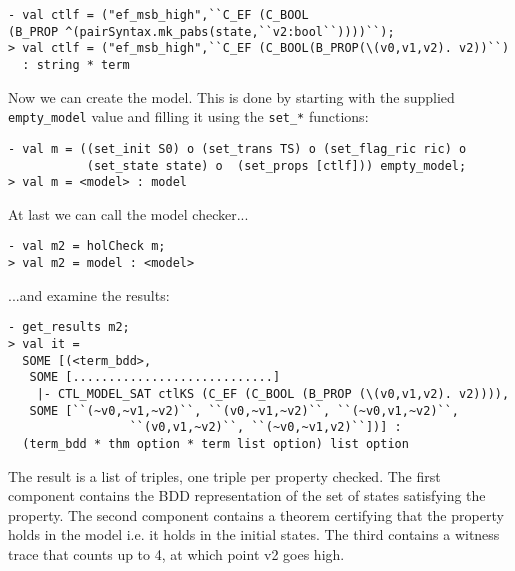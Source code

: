 \documentclass[12pt,fleqn]{article}
\begin{document}
\begin{session}\begin{verbatim}
- val ctlf = ("ef_msb_high",``C_EF (C_BOOL
(B_PROP ^(pairSyntax.mk_pabs(state,``v2:bool``))))``);
> val ctlf = ("ef_msb_high",``C_EF (C_BOOL(B_PROP(\(v0,v1,v2). v2))``)
  : string * term
\end{verbatim}\end{session}
Now we can create the model. This is done by starting with the supplied \texttt{empty\_model} value and filling it using the \texttt{set\_*} functions:
\begin{session}\begin{verbatim}
- val m = ((set_init S0) o (set_trans TS) o (set_flag_ric ric) o
           (set_state state) o  (set_props [ctlf])) empty_model;
> val m = <model> : model
\end{verbatim}\end{session}
At last we can call the model checker...
\begin{session}\begin{verbatim}
- val m2 = holCheck m;
> val m2 = model : <model>
\end{verbatim}\end{session}
...and examine the results:
\begin{session}\begin{verbatim}
- get_results m2;
> val it =
  SOME [(<term_bdd>,
   SOME [............................]
    |- CTL_MODEL_SAT ctlKS (C_EF (C_BOOL (B_PROP (\(v0,v1,v2). v2)))),
   SOME [``(~v0,~v1,~v2)``, ``(v0,~v1,~v2)``, ``(~v0,v1,~v2)``,
                 ``(v0,v1,~v2)``, ``(~v0,~v1,v2)``])] :
  (term_bdd * thm option * term list option) list option
\end{verbatim}\end{session}
The result is a list of triples, one triple per property checked. The first component contains the BDD representation of the set of states satisfying the property. The second component contains a theorem certifying that the property holds in the model i.e. it holds in the initial states. The third contains a witness trace that counts up to 4, at which point v2 goes high.
\end{document}
